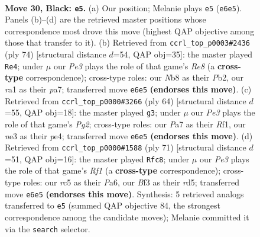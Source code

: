 \documentclass[11pt]{article}
\begin{document}
\clearpage

\begin{figure}[p]\centering
\begin{subfigure}{0.46\textwidth}\centering
\resizebox{\linewidth}{!}{%
\newchessgame
\chessboard[
  setfen={rn4k1/p5pp/4pp2/1PR4P/P7/4Nb2/8/R1K5 b - - 0 30},
  showmover=false,
  pgfstyle=straightmove, color=movearrow, markmove={e6-e5}
]}
\caption{}
\end{subfigure}\hfill
\begin{subfigure}{0.46\textwidth}\centering
\resizebox{\linewidth}{!}{%
\newchessgame
\chessboard[
  setfen={4R3/p4rpk/1p3p2/5r2/P2B1n1P/2P2P2/1PK5/3R4 w - - 1 38},
  showmover=false,
  pgfstyle=straightmove, color=movearrow, markmove={e8-e4}
]}
\caption{}
\end{subfigure}
\\[4pt]
\begin{subfigure}{0.46\textwidth}\centering
\resizebox{\linewidth}{!}{%
\newchessgame
\chessboard[
  setfen={4r1k1/7p/3R2p1/p2P4/P3pP2/2r5/6PP/5R1K w - - 0 33},
  showmover=false,
  pgfstyle=straightmove, color=movearrow, markmove={g2-g3}
]}
\caption{}
\end{subfigure}\hfill
\begin{subfigure}{0.46\textwidth}\centering
\resizebox{\linewidth}{!}{%
\newchessgame
\chessboard[
  setfen={5rk1/6p1/p4p2/p2R1P1p/P6P/1P1R2K1/2r5/8 b - - 1 36},
  showmover=false,
  pgfstyle=straightmove, color=movearrow, markmove={f8-c8}
]}
\caption{}
\end{subfigure}
\caption{\textbf{Move 30, Black: \texttt{e5}.} (a) Our position; Melanie plays \texttt{e5} (\texttt{e6e5}). Panels (b)--(d) are the retrieved master positions whose correspondence most drove this move (highest QAP objective among those that transfer to it). (b) Retrieved from \texttt{ccrl\_top\_p0003\#2436} (ply 74) [structural distance $d$=54, QAP obj=35]: the master played \texttt{Re4}; under $\mu$ our \emph{Pe3} plays the role of that game's \emph{Re8} (a \textbf{cross-type} correspondence); cross-type roles: our \emph{N}b8 as their \emph{P}b2, our \emph{r}a1 as their \emph{p}a7; transferred move \texttt{e6e5} \textbf{(endorses this move)}. (c) Retrieved from \texttt{ccrl\_top\_p0000\#3266} (ply 64) [structural distance $d$=55, QAP obj=18]: the master played \texttt{g3}; under $\mu$ our \emph{Pe3} plays the role of that game's \emph{Pg2}; cross-type roles: our \emph{P}a7 as their \emph{R}f1, our \emph{n}e3 as their \emph{p}e4; transferred move \texttt{e6e5} \textbf{(endorses this move)}. (d) Retrieved from \texttt{ccrl\_top\_p0000\#1588} (ply 71) [structural distance $d$=51, QAP obj=16]: the master played \texttt{Rfc8}; under $\mu$ our \emph{Pe3} plays the role of that game's \emph{Rf1} (a \textbf{cross-type} correspondence); cross-type roles: our \emph{r}c5 as their \emph{P}a6, our \emph{B}f3 as their \emph{r}d5; transferred move \texttt{e6e5} \textbf{(endorses this move)}. Synthesis: 5 retrieved analogs transferred to \texttt{e5} (summed QAP objective 84, the strongest correspondence among the candidate moves); Melanie committed it via the \texttt{search} selector.}
\label{fig:thought-m59}
\end{figure}
\end{document}
